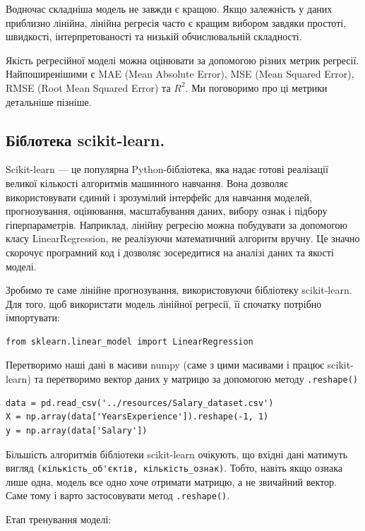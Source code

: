 Водночас складніша модель не завжди є кращою. Якщо залежність у даних приблизно лінійна, лінійна регресія часто є кращим вибором завдяки простоті, швидкості, інтерпретованості та низькій обчислювальній складності.

Якість регресійної моделі можна оцінювати за допомогою різних метрик регресії. Найпоширенішими є MAE (Mean Absolute Error), MSE (Mean Squared Error), RMSE (Root Mean Squared Error) та $R^{2}$. Ми поговоримо про ці метрики детальніше пізніше.


\subsection{Біблотека scikit-learn.}

Scikit-learn — це популярна Python-бібліотека, яка надає готові реалізації великої кількості алгоритмів машинного навчання. Вона дозволяє використовувати єдиний і зрозумілий інтерфейс для навчання моделей, прогнозування, оцінювання, масштабування даних, вибору ознак і підбору гіперпараметрів. Наприклад, лінійну регресію можна побудувати за допомогою класу LinearRegression, не реалізуючи математичний алгоритм вручну. Це значно скорочує програмний код і дозволяє зосередитися на аналізі даних та якості моделі.

Зробимо те саме лінійне прогнозування, використовуючи бібліотеку scikit-learn. Для того, щоб використати модель лінійної регресії, її спочатку потрібно імпортувати:

\begin{lstlisting}
from sklearn.linear_model import LinearRegression
\end{lstlisting}


Перетворимо наші дані в масиви numpy (саме з цими масивами і працює scikit-learn) та перетворимо вектор даних у матрицю за допомогою методу \verb|.reshape()|

\begin{lstlisting}
data = pd.read_csv('../resources/Salary_dataset.csv')
X = np.array(data['YearsExperience']).reshape(-1, 1)  
y = np.array(data['Salary'])  
\end{lstlisting}

 Більшість алгоритмів бібліотеки scikit-learn очікують, що вхідні дані матимуть вигляд \verb|(кількість_об'єктів, кількість_ознак)|. Тобто, навіть якщо ознака лише одна, модель все одно хоче отримати матрицю, а не звичайний вектор. Саме тому і варто застосовувати метод \verb|.reshape()|.

Етап тренування моделі:

